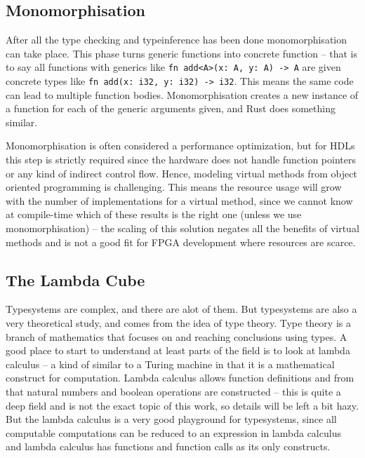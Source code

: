\subsection{Monomorphisation}
\label{sec:Monomorphisation}
After all the type checking and typeinference has been done monomorphisation can take place. This phase turns generic functions into concrete function -- that is to say all functions with generics like \verb+fn add<A>(x: A, y: A) -> A+ are given concrete types like \verb+fn add(x: i32, y: i32) -> i32+. This means the same code can lead to multiple function bodies. Monomorphisation creates a new instance of a function for each of the generic arguments given, and Rust does something similar. \cite{src:rustMono}

Monomorphisation is often considered a performance optimization, but for HDLs this step is strictly required since the hardware does not handle function pointers or any kind of indirect control flow. Hence, modeling virtual methods from object oriented programming is challenging. This means the resource usage will grow with the number of implementations for a virtual method, since we cannot know at compile-time which of these results is the right one (unless we use monomorphisation) -- the scaling of this solution negates all the benefits of virtual methods and is not a good fit for FPGA development where resources are scarce. 

\subsection{The Lambda Cube}
\label{sec:lambdaCube}
Typesystems are complex, and there are alot of them. But typesystems are also a very theoretical study, and comes from the idea of type theory. Type theory is a branch of mathematics that focuses on and reaching conclusions using types. A good place to start to understand at least parts of the field is to look at lambda calculus -- a kind of  similar to a Turing machine in that it is a mathematical construct for computation. Lambda calculus allows function definitions and from that natural numbers and boolean operations are constructed -- this is quite a deep field and is not the exact topic of this work, so details will be left a bit hazy. But the lambda calculus is a very good playground for typesystems, since all computable computations can be reduced to an expression in lambda calculus and lambda calculus has functions and function calls as its only constructs.

